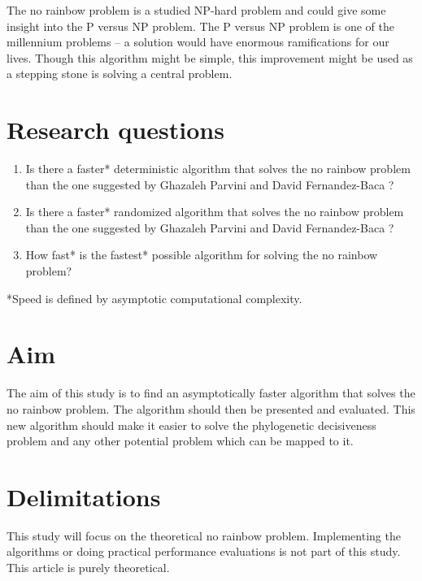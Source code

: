 \documentclass[msc,lith,english]{liuthesis}
\begin{document}
The no rainbow problem is a studied NP-hard problem and could give some insight into the P versus NP problem.
The P versus NP problem is one of the millennium problems -- a solution would have enormous ramifications for our lives.
Though this algorithm might be simple, this improvement might be used as a
stepping stone is solving a central problem.


\section{Research questions}
\begin{enumerate}
  \item Is there a faster* deterministic algorithm that solves the no rainbow problem than the one suggested by Ghazaleh Parvini and David Fernandez-Baca \cite{sourceNoRainbow}?
  \item Is there a faster* randomized algorithm that solves the no rainbow problem than the one suggested by Ghazaleh Parvini and David Fernandez-Baca \cite{sourceNoRainbow}?
  \item How fast* is the fastest* possible algorithm for solving the no rainbow problem? 
\end{enumerate}
*Speed is defined by asymptotic computational complexity.

\section{Aim}
The aim of this study is to find an asymptotically faster algorithm that solves
the no rainbow problem. The algorithm should then be presented and evaluated.
This new algorithm should make it easier to solve the phylogenetic decisiveness
problem and any other potential problem which can be mapped to it.

\section{Delimitations}
This study will focus on the theoretical no rainbow problem.
Implementing the algorithms or doing practical performance evaluations is not part of this study.
This article is purely theoretical.
\end{document}
